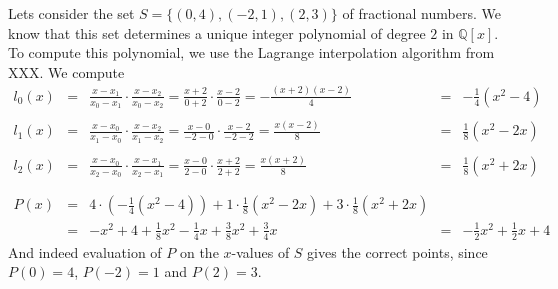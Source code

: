 \begin{example} Lets consider the set $S=\{(0,4),(-2,1),(2,3)\}$ of fractional numbers. We know that this set determines a unique integer polynomial of degree $2$ in $\mathbb{Q}[x]$. To compute this polynomial, we use the Lagrange interpolation algorithm from XXX. We compute 
$$
\begin{array}{lcccl}
l_0(x) & = & \frac{x-x_1}{x_0-x_1}\cdot\frac{x-x_2}{x_0-x_2}
         = \frac{x+2}{0+2}\cdot\frac{x-2}{0-2}
         =  -\frac{(x+2)(x-2)}{4}
       & = & -\frac{1}{4}(x^2-4)\\
         \\
l_1(x) & = & \frac{x-x_0}{x_1-x_0}\cdot\frac{x-x_2}{x_1-x_2}
         = \frac{x-0}{-2-0}\cdot \frac{x-2}{-2-2}
         = \frac{x(x-2)}{8}
       & = & \frac{1}{8}(x^2-2x)\\
         \\
l_2(x) & = & \frac{x-x_0}{x_2-x_0}\cdot\frac{x-x_1}{x_2-x_1}
         = \frac{x-0}{2-0}\cdot\frac{x+2}{2+2}
         = \frac{x(x+2)}{8}
       & = & \frac{1}{8}(x^2+2x)\\
       \\
       \\
P(x)   & = &  4\cdot (-\frac{1}{4}(x^2-4)) + 1\cdot \frac{1}{8}(x^2-2x) + 3\cdot \frac{1}{8}(x^2+2x) 
       & & \\
       & = & -x^2+4 + \frac{1}{8}x^2-\frac{1}{4} x + \frac{3}{8}x^2+\frac{3}{4} x 
       & = & -\frac{1}{2} x^2 +\frac{1}{2} x + 4        
\end{array}
$$
And indeed evaluation of $P$ on the $x$-values of $S$ gives the correct points, since $P(0)=4$, $P(-2)=1$ and $P(2)=3$.
\end{example}
